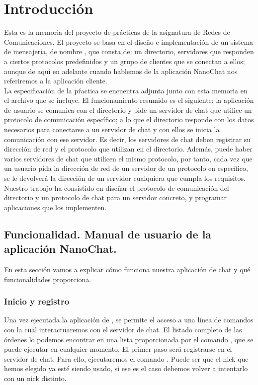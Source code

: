 \section{Introducción}
Esta es la memoria del proyecto de prácticas de la asignatura de Redes de Comunicaciones. El proyecto se basa en el diseño e implementación de un sistema de mensajería, de nombre , que consta de: un directorio, servidores que responden a ciertos protocolos predefinidos y un grupo de clientes que se conectan a ellos; aunque de aquí en adelante cuando hablemos de la aplicación NanoChat nos referiremos a la aplicación cliente. \\

La especificación de la pŕactica se encuentra adjunta junto con esta memoria en el archivo que se incluye. El funcionamiento resumido es el siguiente: la aplicación de usuario se comunica con el directorio y pide un servidor de chat que utilice un protocolo de comunicación específico; a lo que el directorio responde con los datos necesarios para conectarse a un servidor de chat y con ellos se inicia la comunicación con ese servidor. Es decir, los servidores de chat deben registrar su dirección de red  y el protocolo que utilizan en el directorio. Además, puede haber varios servidores de chat que utilicen el mismo protocolo, por tanto, cada vez que un usuario pida la dirección de red de un servidor de un protocolo en específico, se le devolverá la dirección de un servidor cualquiera que cumpla los requisitos. \\

Nuestro trabajo ha consistido en diseñar el protocolo de comunicación del directorio y un protocolo de chat para un servidor concreto, y programar aplicaciones que los implementen.

\subsection{Funcionalidad. Manual de usuario de la aplicación NanoChat.}
En esta sección vamos a explicar cómo funciona nuestra aplicación de chat y qué funcionalidades proporciona.

\subsubsection{Inicio y registro}
Una vez ejecutada la aplicación de , se permite el acceso a una línea de comandos con la cual interactuaremos con el servidor de chat. El listado completo de las órdenes lo podemos encontrar en una lista proporcionada por el comando , que se puede ejecutar en cualquier momento. El primer paso será registrarse en el servidor de chat. Para ello, ejecutaremos el comando . Puede ser que el nick que hemos elegido ya esté siendo usado, si ese es el caso debemos volver a intentarlo con un nick distinto.

